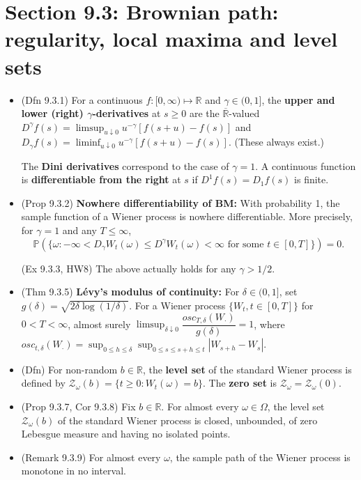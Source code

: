 \documentclass[twoside]{article}
\newcommand{\dis}{\displaystyle}
\newcommand\bbP{\mathbb{P}}
\newcommand\bbR{\mathbb{R}}
\newcommand\dlt{\delta}
\newcommand\om{\omega}
\newcommand\Om{\Omega}
\begin{document}
\section*{Section 9.3: Brownian path: regularity, local maxima and level sets}
\begin{itemize}
\item (Dfn 9.3.1) For a continuous $f: [0, \infty) \mapsto \bbR$ and $\gamma \in (0,1]$, the \textbf{upper and lower (right) $\gamma$-derivatives} at $s \geq 0$ are the $\overline{\bbR}$-valued $D^\gamma f(s) = \dis\limsup_{u \downarrow 0} u^{-\gamma}[f(s+u) - f(s)]$ and $D_\gamma f(s) = \dis\liminf_{u \downarrow 0} u^{-\gamma}[f(s+u) - f(s)]$. (These always exist.)

The \textbf{Dini derivatives} correspond to the case of $\gamma = 1$. A continuous function is \textbf{differentiable from the right} at $s$ if $D^1 f(s) = D_1 f(s)$ is finite.

\item (Prop 9.3.2) \textbf{Nowhere differentiability of BM:} With probability 1, the sample function of a Wiener process is nowhere differentiable. More precisely, for $\gamma = 1$ and any $T \leq \infty$,
\[\bbP (\{ \om: -\infty < D_\gamma W_t(\om) \leq D^\gamma W_t(\om) < \infty \text{ for some } t \in [0,T] \}) = 0. \]

(Ex 9.3.3, HW8) The above actually holds for any $\gamma > 1/2$.

\item (Thm 9.3.5) \textbf{L\'{e}vy's modulus of continuity:} For $\dlt \in (0, 1]$, set $g(\dlt) = \sqrt{2\dlt \log (1/\dlt)}$. For a Wiener process $\{W_t, t\in [0,T] \}$ for $0 < T < \infty$, almost surely $\dis\limsup_{\dlt \downarrow 0} \dfrac{osc_{T, \dlt}(W_\cdot)}{g(\dlt)} = 1$, where $osc_{t, \dlt}(W_\cdot) = \dis\sup_{0 \leq h \leq \dlt}\sup_{0 \leq s \leq s+h \leq t} |W_{s+h} - W_s|$.

\item (Dfn) For non-random $b \in \bbR$, the \textbf{level set} of the standard Wiener process is defined by $\mathcal{Z}_\om(b) = \{t \geq 0: W_t(\om) = b \}$. The \textbf{zero set} is $\mathcal{Z}_\om = \mathcal{Z}_\om(0)$.

\item (Prop 9.3.7, Cor 9.3.8) Fix $b \in \bbR$. For almost every $\om \in \Om$, the level set $\mathcal{Z}_\om(b)$ of the standard Wiener process is closed, unbounded, of zero Lebesgue measure and having no isolated points.

\item (Remark 9.3.9) For almost every $\om$, the sample path of the Wiener process is monotone in no interval.


\end{itemize}
\end{document}
